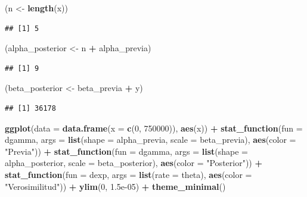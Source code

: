 \documentclass[
  12pt,
]{book}
\newenvironment{Shaded}{\begin{snugshade}}{\end{snugshade}}
\newcommand{\DataTypeTok}[1]{\textcolor[rgb]{0.13,0.29,0.53}{#1}}
\newcommand{\DecValTok}[1]{\textcolor[rgb]{0.00,0.00,0.81}{#1}}
\newcommand{\FloatTok}[1]{\textcolor[rgb]{0.00,0.00,0.81}{#1}}
\newcommand{\KeywordTok}[1]{\textcolor[rgb]{0.13,0.29,0.53}{\textbf{#1}}}
\newcommand{\NormalTok}[1]{#1}
\newcommand{\OperatorTok}[1]{\textcolor[rgb]{0.81,0.36,0.00}{\textbf{#1}}}
\newcommand{\StringTok}[1]{\textcolor[rgb]{0.31,0.60,0.02}{#1}}
\begin{document}
\begin{Shaded}
\begin{Highlighting}[]
\NormalTok{(n \textless{}{-}}\StringTok{ }\KeywordTok{length}\NormalTok{(x))}
\end{Highlighting}
\end{Shaded}

\begin{verbatim}
## [1] 5
\end{verbatim}

\begin{Shaded}
\begin{Highlighting}[]
\NormalTok{(alpha\_posterior \textless{}{-}}\StringTok{ }\NormalTok{n }\OperatorTok{+}\StringTok{ }\NormalTok{alpha\_previa)}
\end{Highlighting}
\end{Shaded}

\begin{verbatim}
## [1] 9
\end{verbatim}

\begin{Shaded}
\begin{Highlighting}[]
\NormalTok{(beta\_posterior \textless{}{-}}\StringTok{ }\NormalTok{beta\_previa }\OperatorTok{+}\StringTok{ }\NormalTok{y)}
\end{Highlighting}
\end{Shaded}

\begin{verbatim}
## [1] 36178
\end{verbatim}

\begin{Shaded}
\begin{Highlighting}[]
\KeywordTok{ggplot}\NormalTok{(}\DataTypeTok{data =} \KeywordTok{data.frame}\NormalTok{(}\DataTypeTok{x =} \KeywordTok{c}\NormalTok{(}\DecValTok{0}\NormalTok{, }\DecValTok{750000}\NormalTok{)), }\KeywordTok{aes}\NormalTok{(x)) }\OperatorTok{+}\StringTok{ }
\StringTok{    }\KeywordTok{stat\_function}\NormalTok{(}\DataTypeTok{fun =}\NormalTok{ dgamma, }\DataTypeTok{args =} \KeywordTok{list}\NormalTok{(}\DataTypeTok{shape =}\NormalTok{ alpha\_previa, }
        \DataTypeTok{scale =}\NormalTok{ beta\_previa), }\KeywordTok{aes}\NormalTok{(}\DataTypeTok{color =} \StringTok{"Previa"}\NormalTok{)) }\OperatorTok{+}\StringTok{ }
\StringTok{    }\KeywordTok{stat\_function}\NormalTok{(}\DataTypeTok{fun =}\NormalTok{ dgamma, }\DataTypeTok{args =} \KeywordTok{list}\NormalTok{(}\DataTypeTok{shape =}\NormalTok{ alpha\_posterior, }
        \DataTypeTok{scale =}\NormalTok{ beta\_posterior), }\KeywordTok{aes}\NormalTok{(}\DataTypeTok{color =} \StringTok{"Posterior"}\NormalTok{)) }\OperatorTok{+}\StringTok{ }
\StringTok{    }\KeywordTok{stat\_function}\NormalTok{(}\DataTypeTok{fun =}\NormalTok{ dexp, }\DataTypeTok{args =} \KeywordTok{list}\NormalTok{(}\DataTypeTok{rate =}\NormalTok{ theta), }
        \KeywordTok{aes}\NormalTok{(}\DataTypeTok{color =} \StringTok{"Verosimilitud"}\NormalTok{)) }\OperatorTok{+}\StringTok{ }\KeywordTok{ylim}\NormalTok{(}\DecValTok{0}\NormalTok{, }\FloatTok{1.5e{-}05}\NormalTok{) }\OperatorTok{+}\StringTok{ }
\StringTok{    }\KeywordTok{theme\_minimal}\NormalTok{()}
\end{Highlighting}
\end{Shaded}
\end{document}
